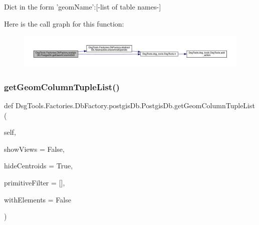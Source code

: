 \begin{DoxyVerb}Dict in the form 'geomName':[-list of table names-]
\end{DoxyVerb}
 Here is the call graph for this function\+:
\nopagebreak
\begin{figure}[H]
\begin{center}
\leavevmode
\includegraphics[width=350pt]{class_dsg_tools_1_1_factories_1_1_db_factory_1_1postgis_db_1_1_postgis_db_a8be34572229ea3f0a90d93678ca80eaa_cgraph}
\end{center}
\end{figure}
\mbox{\label{class_dsg_tools_1_1_factories_1_1_db_factory_1_1postgis_db_1_1_postgis_db_ac040dfd453d8439f6a23eac91d313afc}} 
\subsubsection{\texorpdfstring{get\+Geom\+Column\+Tuple\+List()}{getGeomColumnTupleList()}}
{\footnotesize\ttfamily def Dsg\+Tools.\+Factories.\+Db\+Factory.\+postgis\+Db.\+Postgis\+Db.\+get\+Geom\+Column\+Tuple\+List (\begin{DoxyParamCaption}\item[{}]{self,  }\item[{}]{show\+Views = {\ttfamily False},  }\item[{}]{hide\+Centroids = {\ttfamily True},  }\item[{}]{primitive\+Filter = {\ttfamily \mbox{[}\mbox{]}},  }\item[{}]{with\+Elements = {\ttfamily False} }\end{DoxyParamCaption})}

